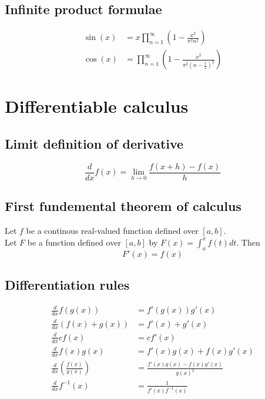 \documentclass{article}
\begin{document}
\subsection{Infinite product formulae}
\begin{align}
\sin(x)&=x\prod_{n=1}^{\infty}\left(1-\frac{x^2}{\pi^2n^2}\right)\\
\cos(x)&=\prod_{n=1}^{\infty}\left(1-\frac{x^2}{\pi^2\left(n-\frac{1}{2}\right)^2}\right)
\end{align}

\section{Differentiable calculus}

\subsection{Limit definition of derivative}
\begin{equation}
\frac{d}{dx}f(x)=\lim_{h\rightarrow0}\frac{f(x+h)-f(x)}{h}
\end{equation}

\subsection{First fundemental theorem of calculus}
Let $f$ be a continous real-valued function defined over $[a,b]$.\\
Let $F$ be a function defined over $[a,b]$ by $F(x)=\int_a^xf(t)dt$. Then
\begin{equation}
F'(x)=f(x)
\end{equation}

\subsection{Differentiation rules}
\begin{align}
\frac{d}{dx}f(g(x))&=f'(g(x))g'(x)\\
\frac{d}{dx}(f(x)+g(x))&=f'(x)+g'(x)\\
\frac{d}{dx}cf(x)&=cf'(x)\\
\frac{d}{dx}f(x)g(x)&=f'(x)g(x)+f(x)g'(x)\\
\frac{d}{dx}\left(\frac{f(x)}{g(x)}\right)&=\frac{f'(x)g(x)-f(x)g'(x)}{g(x)^2}\\
\frac{d}{dx}f^{-1}(x)&=\frac{1}{f'(x)f^{-1}(x)}
\end{align}
\end{document}
